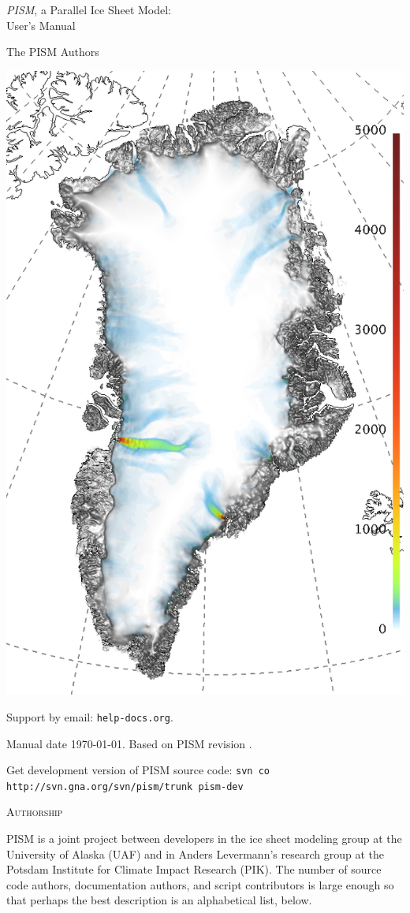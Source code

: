 \documentclass[titlepage,letterpaper,final]{scrartcl}
\newcommand{\PISMREV}{revision }
\newcommand{\PISMDOWNLOADMSG}{Get development version of PISM source code: \quad\texttt{svn co http://svn.gna.org/svn/pism/trunk pism-dev} \quad}
\newcommand{\normalspacing}{\renewcommand{\baselinestretch}{1.1}\tiny\normalsize}
\begin{document}
\graphicspath{{figs/}}

\begin{titlepage}
  \begin{center}
    {\huge{} \emph{PISM}, a Parallel Ice Sheet Model:\\\medskip User's Manual}
    \vspace{1cm}

    {\Large The PISM Authors}
    \vspace{3cm}

    \includegraphics[width=3.in,keepaspectratio=true]{grn-grl-csurf}
    \vfill

    \small Support by email: \texttt{help\@@pism-docs.org}. 
    \medskip

    Manual date \today. Based on PISM \PISMREV.
    \medskip
    
    \PISMDOWNLOADMSG
  \end{center}
\end{titlepage}

\newpage
\phantom{bob}

\centerline{\textsc{Authorship}}
\bigskip

\normalspacing
PISM is a joint project between developers in the ice sheet modeling group at the University of Alaska (UAF) and in Anders Levermann's research group at the Potsdam Institute for Climate Impact Research (PIK).  The number of source code authors, documentation authors, and script contributors is large enough so that perhaps the best description is an alphabetical list, below.
\bigskip
\normalspacing
\end{document}
